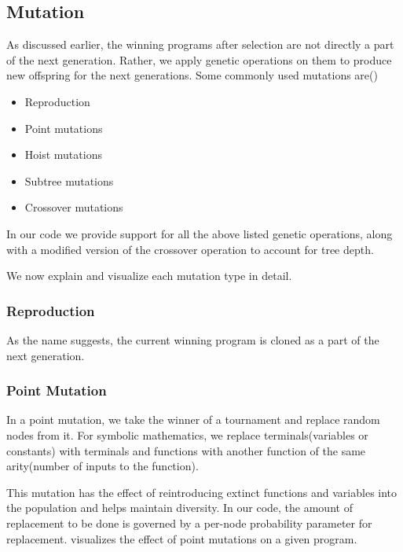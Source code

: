 \subsection{Mutation}
\label{subsec:mutation}
As discussed earlier, the winning programs after selection are not directly a part of the next generation. Rather, we apply genetic operations on them to produce new offspring for the next generations. Some commonly used mutations are(\citep{gplearn})
\begin{itemize}
  \item Reproduction
  \item Point mutations
  \item Hoist mutations
  \item Subtree mutations
  \item Crossover mutations
\end{itemize}
In our code we provide support for all the above listed genetic operations, along with a modified version of the crossover operation to account for tree depth.

We now explain and visualize each mutation type in detail.

\subsubsection{Reproduction}
\label{mut:clone}
As the name suggests, the current winning program is cloned as a part of the next generation.
\subsubsection{Point Mutation}
\label{mut:point}
In a point mutation, we take the winner of a tournament and replace random nodes from it. For symbolic mathematics, we replace terminals(variables or constants) with terminals and functions with another function of the same arity(number of inputs to the function).

This mutation has the effect of reintroducing extinct functions and variables into the population and helps maintain diversity\citep{gplearn}. In our code, the amount of replacement to be done is governed by a per-node probability parameter for replacement.  visualizes the effect of point mutations on a given program.

